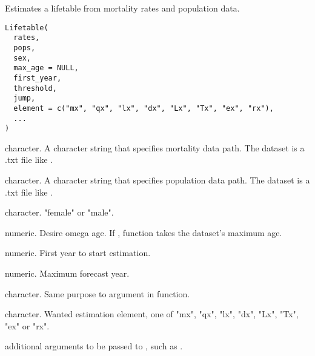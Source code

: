 \documentclass[a4paper]{book}
\begin{document}
%
\begin{Description}\relax
Estimates a lifetable from mortality rates and population data.
\end{Description}
%
\begin{Usage}
\begin{verbatim}
Lifetable(
  rates,
  pops,
  sex,
  max_age = NULL,
  first_year,
  threshold,
  jump,
  element = c("mx", "qx", "lx", "dx", "Lx", "Tx", "ex", "rx"),
  ...
)
\end{verbatim}
\end{Usage}
%
\begin{Arguments}
\begin{ldescription}
\item[\code{rates}] character. A character string that specifies mortality data path. The dataset is a .txt file like .

\item[\code{pops}] character. A character string that specifies population data path. The dataset is a .txt file like .

\item[\code{sex}] character. "female" or "male".

\item[\code{max\_age}] numeric. Desire omega age. If ,  function takes the dataset's maximum age.

\item[\code{first\_year}] numeric. First year to start estimation.

\item[\code{threshold}] numeric. Maximum forecast year.

\item[\code{jump}] character. Same purpose to  argument in  function.

\item[\code{element}] character. Wanted estimation element, one of "mx", "qx", "lx", "dx", "Lx", "Tx", "ex" or "rx".

\item[\code{...}] additional arguments to be passed to , such as .
\end{ldescription}
\end{Arguments}
\end{document}

